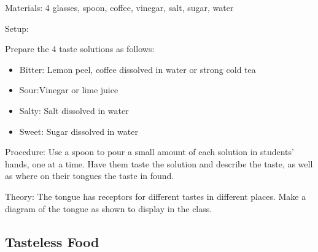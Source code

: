 \begin{multicols}{2}
\begin{description*}
\item[Materials:]{4 glasses, spoon, coffee, vinegar, salt, sugar, water}
\item[Setup:]{Prepare the 4 taste solutions as follows:
\begin{itemize}
\item Bitter: Lemon peel, coffee dissolved in water or strong cold tea
\item Sour:Vinegar or lime juice
\item Salty: Salt dissolved in water
\item Sweet: Sugar dissolved in water
\end{itemize}}
\item[Procedure:]{Use a spoon to pour a small amount of each solution in students' hands, one at a time. Have them taste the solution and describe the taste, as well as where on their tongues the taste in found.}
\item[Theory:]{The tongue has receptors for different tastes in different places. Make a diagram of the tongue as shown to display in the class.}
\end{description*}

\subsection{Tasteless Food}



\end{multicols}
